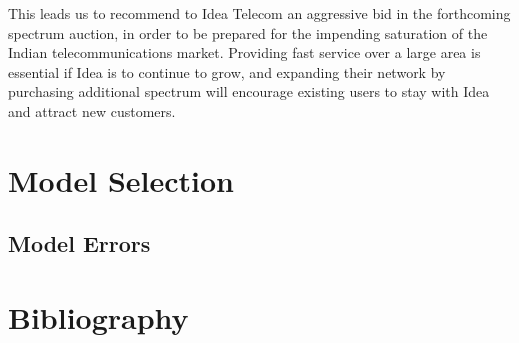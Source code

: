 \documentclass[11pt]{article}
\begin{document}
		This leads us to recommend to Idea Telecom an aggressive bid in the forthcoming spectrum auction, in order to be prepared for the impending saturation of the Indian telecommunications market.
		Providing fast service over a large area is essential if Idea is to continue to grow, and expanding their network by purchasing additional spectrum will encourage existing users to stay with Idea and attract new customers. 

\newpage


\appendix
\appendixpage
\addappheadtotoc
\section{Model Selection} \label{app:mod}
\subsection{Model Errors} \label{err}

\newpage
\section{Bibliography}


\end{document}
